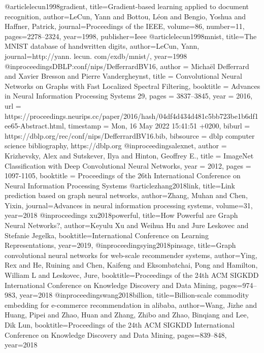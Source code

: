 @article{lecun1998gradient,
  title={Gradient-based learning applied to document recognition},
  author={LeCun, Yann and Bottou, L{\'e}on and Bengio, Yoshua and Haffner, Patrick},
  journal={Proceedings of the IEEE},
  volume={86},
  number={11},
  pages={2278--2324},
  year={1998},
  publisher={Ieee}
}
@article{lecun1998mnist,
  title={The MNIST database of handwritten digits},
  author={LeCun, Yann},
  journal={http://yann. lecun. com/exdb/mnist/},
  year={1998}
}
@inproceedings{DBLP:conf/nips/DefferrardBV16,
  author       = {Micha{\"{e}}l Defferrard and
                  Xavier Bresson and
                  Pierre Vandergheynst},
  title        = {Convolutional Neural Networks on Graphs with Fast Localized Spectral
                  Filtering},
  booktitle    = {Advances in Neural Information Processing Systems 29},
  pages        = {3837--3845},
  year         = {2016},
  url          = {https://proceedings.neurips.cc/paper/2016/hash/04df4d434d481c5bb723be1b6df1ee65-Abstract.html},
  timestamp    = {Mon, 16 May 2022 15:41:51 +0200},
  biburl       = {https://dblp.org/rec/conf/nips/DefferrardBV16.bib},
  bibsource    = {dblp computer science bibliography, https://dblp.org}
}
@inproceedings{alexnet,
author = {Krizhevsky, Alex and Sutskever, Ilya and Hinton, Geoffrey E.},
title = {ImageNet Classification with Deep Convolutional Neural Networks},
year = {2012},
pages = {1097-1105},
booktitle = {Proceedings of the 26th International Conference on Neural Information Processing Systems}
}
@article{zhang2018link,
  title={Link prediction based on graph neural networks},
  author={Zhang, Muhan and Chen, Yixin},
  journal={Advances in neural information processing systems},
  volume={31},
  year={2018}
}
@inproceedings{
	xu2018powerful,
	title={How Powerful are Graph Neural Networks?},
	author={Keyulu Xu and Weihua Hu and Jure Leskovec and Stefanie Jegelka},
	booktitle={International Conference on Learning Representations},
	year={2019},
}
@inproceedings{ying2018pinsage,
  title={Graph convolutional neural networks for web-scale recommender systems},
  author={Ying, Rex and He, Ruining and Chen, Kaifeng and Eksombatchai, Pong and Hamilton, William L and Leskovec, Jure},
  booktitle={Proceedings of the 24th ACM SIGKDD International Conference on Knowledge Discovery and Data Mining},
  pages={974--983},
  year={2018}
}
@inproceedings{wang2018billion,
  title={Billion-scale commodity embedding for e-commerce recommendation in alibaba},
  author={Wang, Jizhe and Huang, Pipei and Zhao, Huan and Zhang, Zhibo and Zhao, Binqiang and Lee, Dik Lun},
  booktitle={Proceedings of the 24th ACM SIGKDD International Conference on Knowledge Discovery and Data Mining},
  pages={839--848},
  year={2018}
}
